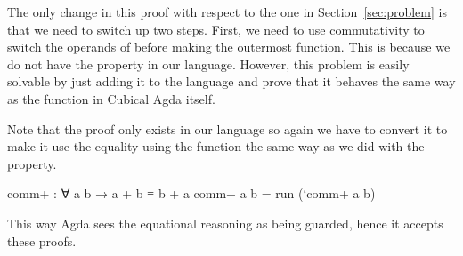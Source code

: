 The only change in this proof with respect to the one in Section~\ref{sec:problem} is that
we need to switch up two steps. First, we need to use commutativity to switch the
operands of \AgdaFunction{\_+\_} before making  the outermost function.
This is because we do not have the  property in our language.
However, this problem is easily solvable by just adding it to the language and
prove that it behaves the same way as the  function in Cubical Agda itself.

Note that the proof only exists in our language so again we have to convert
it to make it use the equality using the  function the same
way as we did with the  property.

\begin{code}
comm+ : ∀ a b → a + b ≡ b + a
comm+ a b = run (`comm+ a b)
\end{code}

This way Agda sees the equational reasoning as being guarded, hence it accepts these proofs.
